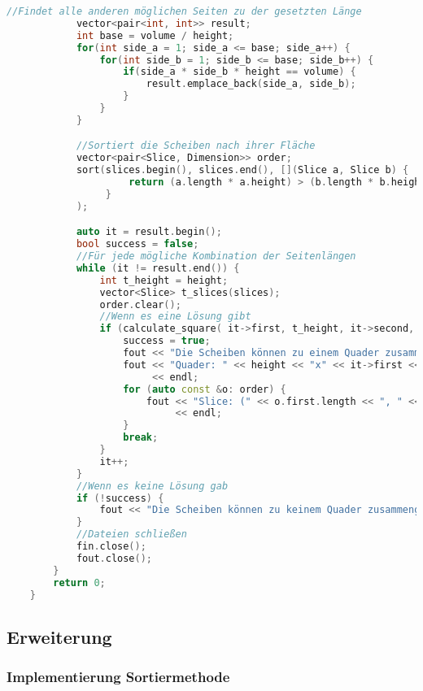 \documentclass[a4paper,10pt,ngerman]{scrartcl}
\begin{document}
\begin{lstlisting}[frame=single,language=C++,title=Methode main,breaklines=true,label={lst:code_main}]
            //Findet alle anderen möglichen Seiten zu der gesetzten Länge
            vector<pair<int, int>> result;
            int base = volume / height;
            for(int side_a = 1; side_a <= base; side_a++) {
                for(int side_b = 1; side_b <= base; side_b++) {
                    if(side_a * side_b * height == volume) {
                        result.emplace_back(side_a, side_b);
                    }
                }
            }

            //Sortiert die Scheiben nach ihrer Fläche
            vector<pair<Slice, Dimension>> order;
            sort(slices.begin(), slices.end(), [](Slice a, Slice b) {
                     return (a.length * a.height) > (b.length * b.height);
                 }
            );

            auto it = result.begin();
            bool success = false;
            //Für jede mögliche Kombination der Seitenlängen
            while (it != result.end()) {
                int t_height = height;
                vector<Slice> t_slices(slices);
                order.clear();
                //Wenn es eine Lösung gibt
                if (calculate_square( it->first, t_height, it->second, order, t_slices)) {
                    success = true;
                    fout << "Die Scheiben können zu einem Quader zusammengesetzt werden." << endl;
                    fout << "Quader: " << height << "x" << it->first << "x" << it->second << " V(" << volume << ")" << endl
                         << endl;
                    for (auto const &o: order) {
                        fout << "Slice: (" << o.first.length << ", " << o.first.height << ") Dimension: " << to_string(o.second)
                             << endl;
                    }
                    break;
                }
                it++;
            }
            //Wenn es keine Lösung gab
            if (!success) {
                fout << "Die Scheiben können zu keinem Quader zusammengesetzt werden." << endl;
            }
            //Dateien schließen
            fin.close();
            fout.close();
        }
        return 0;
    }
    \end{lstlisting}

    \subsection{Erweiterung}\label{subsec:erweiterung}

    \subsubsection{Implementierung Sortiermethode}
\end{document}
